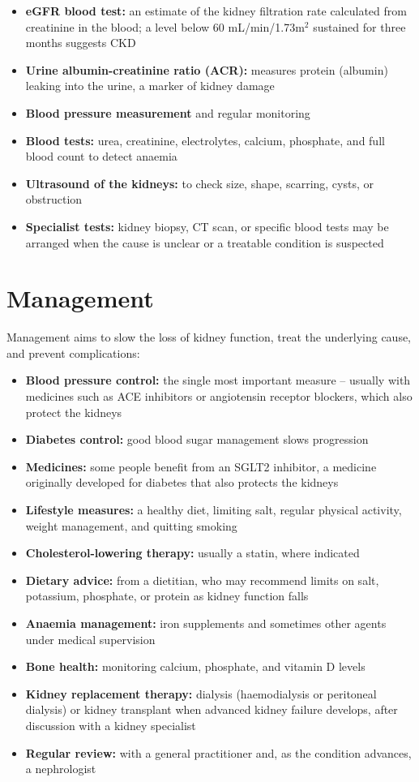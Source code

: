 \begin{itemize}
    \item \textbf{eGFR blood test:} an estimate of the kidney filtration rate calculated from creatinine in the blood; a level below 60 mL/min/1.73m$^2$ sustained for three months suggests CKD
    \item \textbf{Urine albumin-creatinine ratio (ACR):} measures protein (albumin) leaking into the urine, a marker of kidney damage
    \item \textbf{Blood pressure measurement} and regular monitoring
    \item \textbf{Blood tests:} urea, creatinine, electrolytes, calcium, phosphate, and full blood count to detect anaemia
    \item \textbf{Ultrasound of the kidneys:} to check size, shape, scarring, cysts, or obstruction
    \item \textbf{Specialist tests:} kidney biopsy, CT scan, or specific blood tests may be arranged when the cause is unclear or a treatable condition is suspected
\end{itemize}

\section*{Management}
Management aims to slow the loss of kidney function, treat the underlying cause, and prevent complications:

\begin{itemize}
    \item \textbf{Blood pressure control:} the single most important measure -- usually with medicines such as ACE inhibitors or angiotensin receptor blockers, which also protect the kidneys
    \item \textbf{Diabetes control:} good blood sugar management slows progression
    \item \textbf{Medicines:} some people benefit from an SGLT2 inhibitor, a medicine originally developed for diabetes that also protects the kidneys
    \item \textbf{Lifestyle measures:} a healthy diet, limiting salt, regular physical activity, weight management, and quitting smoking
    \item \textbf{Cholesterol-lowering therapy:} usually a statin, where indicated
    \item \textbf{Dietary advice:} from a dietitian, who may recommend limits on salt, potassium, phosphate, or protein as kidney function falls
    \item \textbf{Anaemia management:} iron supplements and sometimes other agents under medical supervision
    \item \textbf{Bone health:} monitoring calcium, phosphate, and vitamin D levels
    \item \textbf{Kidney replacement therapy:} dialysis (haemodialysis or peritoneal dialysis) or kidney transplant when advanced kidney failure develops, after discussion with a kidney specialist
    \item \textbf{Regular review:} with a general practitioner and, as the condition advances, a nephrologist
\end{itemize}

